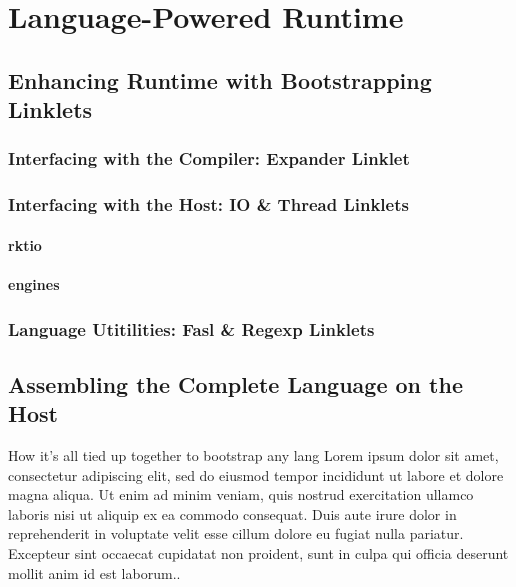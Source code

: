 \chapter{Language-Powered Runtime}
	\section{Enhancing Runtime with Bootstrapping Linklets}

	\subsection{Interfacing with the Compiler: Expander Linklet}

	\subsection{Interfacing with the Host: IO \& Thread Linklets}
	\subsubsection{rktio}
	\subsubsection{engines}

	\subsection{Language Utitilities: Fasl \& Regexp Linklets}

	\section{Assembling the Complete Language on the Host} 

	How it's all tied up together to bootstrap any lang
Lorem ipsum dolor sit amet, consectetur adipiscing elit, sed do eiusmod tempor incididunt ut labore et dolore magna aliqua. Ut enim ad minim veniam, quis nostrud exercitation ullamco laboris nisi ut aliquip ex ea commodo consequat. Duis aute irure dolor in reprehenderit in voluptate velit esse cillum dolore eu fugiat nulla pariatur. Excepteur sint occaecat cupidatat non proident, sunt in culpa qui officia deserunt mollit anim id est laborum..
